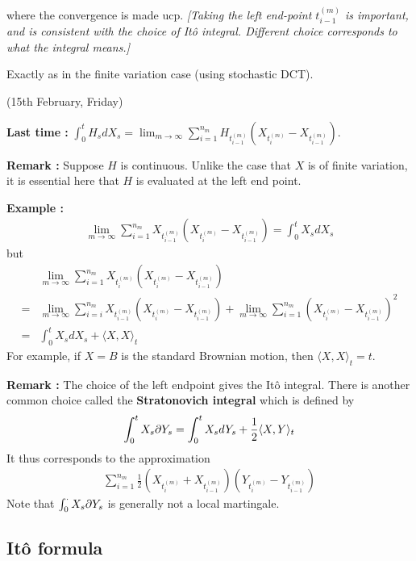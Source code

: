 \documentclass[12pt,a4paper]{article}
\newenvironment{proof}
{\begin{changemargin}{0.5cm}{0.5cm} 
	}%
	{\end{changemargin}
}
\newenvironment{p}
{\begin{proof} 
	}%
	{\end{proof}
}
\begin{document}
where the convergence is made ucp.
\emph{[Taking the left end-point $t_{i-1}^{(m)}$ is important, and is consistent with the choice of It\^o integral. Different choice corresponds to what the integral means.]}
\begin{p}
\pf Exactly as in the finite variation case (using stochastic DCT).
\end{p}
\s

\newday

(15th February, Friday)
\s

\textbf{Last time :} $\int_0^t H_s dX_s = \lim_{m\rightarrow \infty} \sum_{i=1}^{n_m} H_{t_{i-1}^{(m)}} (X_{t_i^{(m)}} - X_{t_{i-1}^{(m)}})$.
\s

\textbf{Remark :} Suppose $H$ is continuous. Unlike the case that $X$ is of finite variation, it is essential here that $H$ is evaluated at the left end point.
\s

\textbf{Example :}
\begin{align*}
\lim_{m\rightarrow \infty} \sum_{i=1}^{n_m} X_{t_{i-1}^{(m)}}(X_{t_i^{(m)}} - X_{t_{i-1}^{(m)}}) = \int_0^t X_s dX_s
\end{align*}
but
\begin{align*}
& \lim_{m\rightarrow \infty} \sum_{i=1}^{n_m} X_{t_i^{(m)}} (X_{t_i^{(m)}} - X_{t_{i-1}^{(m)}}) \\
= & \lim_{m\rightarrow \infty} \sum_{i=i}^{n_m} X_{t_{i-1}^{(m)}} (X_{t_i^{(m)}} - X_{t_{i-1}^{(m)}}) + \lim_{m\rightarrow \infty} \sum_{i=1}^{n_m} (X_{t_i^{(m)}} - X_{t_{i-1}^{(m)}})^2\\
= & \int_0^t X_s dX_s + \langle X, X \rangle_t
\end{align*}
For example, if $X=B$ is the standard Brownian motion, then $\langle X, X\rangle_t =t$.
\s

\textbf{Remark :} The choice of the left endpoint gives the It\^o integral. There is another common choice called the \textbf{Stratonovich integral} which is defined by
\begin{align*}
\int_0^t X_s \partial Y_s = \int_0^t X_s dY_s + \frac{1}{2} \langle X, Y \rangle_t
\end{align*}
It thus corresponds to the approximation
\begin{align*}
\sum_{i=1}^{n_m} \frac{1}{2} (X_{t_i^{(m)}} + X_{t_{i-1}^{(m)}}) (Y_{t_i^{(m)}} - Y_{t_{i-1}^{(m)}})
\end{align*}
Note that $\int_0^{\cdot} X_s \partial Y_s$ is generally not a local martingale. 

\subsection{It\^o formula}
\end{document}
